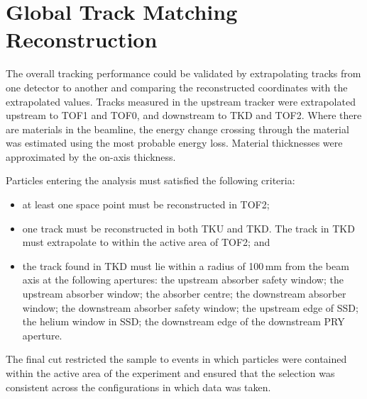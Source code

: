 \graphicspath{{08-Track-matching/Figures/}}

\section{Global Track Matching Reconstruction}
\label{Sect:TM}


\newcommand{\topmatterallplots}[4]{%
    \hspace*{-2.0cm}\texttt{[image: \#1/Figures/\#2/\#3.png]}
    \caption{#4 \label{fig:#3}}
    }

The overall tracking performance could be validated by extrapolating tracks from
one detector to another and comparing the reconstructed coordinates with the 
extrapolated values.
Tracks measured in the upstream tracker were extrapolated upstream to TOF1 and TOF0, and downstream
to TKD and TOF2. Where there are materials in the beamline, the energy change crossing through the material was estimated using the most probable energy loss. 
Material thicknesses were approximated by the on-axis thickness. 

Particles entering the analysis must satisfied the following criteria:
\begin{itemize}
\item at least one space point must be reconstructed in TOF2;
\item one track must be reconstructed in both TKU and TKD. The track in TKD must extrapolate to within the active area of TOF2; and
\item the track found in TKD must lie within a radius of 100\,mm from the beam axis at the following apertures:
the upstream absorber safety window; the upstream absorber window; the absorber centre; the downstream absorber window; the downstream absorber safety window; the upstream edge of SSD; the helium window in SSD; the downstream edge of the downstream PRY aperture.
\end{itemize}
The final cut restricted the sample to events in which particles were contained within the active area of the experiment and ensured that the selection was consistent across the configurations in which data was taken.



